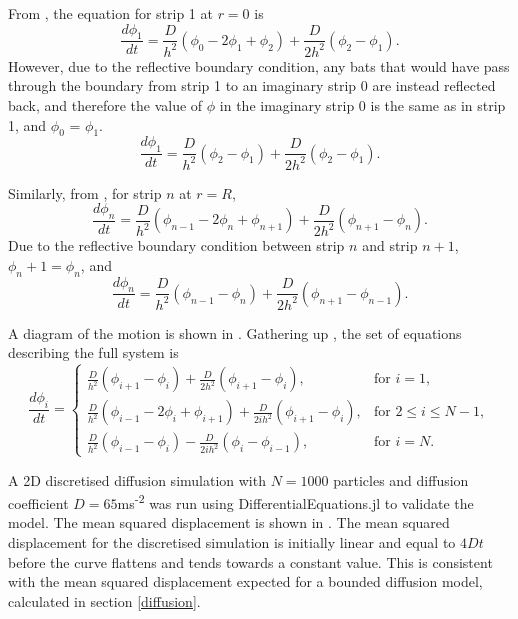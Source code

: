 From , the equation for strip 1 at $r=0$ is
%
\begin{equation}
\frac{d\phi_1}{dt} = \frac{D}{h^2}(\phi_{0}-2\phi_1 +\phi_{2}) + \frac{D}{2h^2} (\phi_{2}-\phi_{1}).
\end{equation}
%
However, due to the reflective boundary condition, any bats that would have pass through the boundary from strip 1 to an imaginary strip 0 are instead reflected back, and therefore the value of $\phi$ in the imaginary strip 0 is the same as in strip 1, and $\phi_0$ = $\phi_1$.
%
\begin{equation}
\frac{d\phi_1}{dt} = \frac{D}{h^2}(\phi_{2}- \phi_1) + \frac{D}{2h^2} (\phi_{2}-\phi_{1}) .
        \label{eqn:strip_1}
\end{equation}

Similarly, from , for strip $n$ at $r=R$,
%
\begin{equation}
\frac{d\phi_n}{dt} = \frac{D}{h^2}(\phi_{n-1}-2\phi_n +\phi_{n+1}) + \frac{D}{2h^2} (\phi_{n+1}-\phi_{n}) .
\end{equation}
%
Due to the reflective boundary condition between strip $n$ and strip $n+1$, $\phi_n+1 = \phi_n$, and
\begin{equation}
\frac{d\phi_n}{dt} = \frac{D}{h^2}(\phi_{n-1}-\phi_n) + \frac{D}{2h^2} (\phi_{n+1}-\phi_{n-1}) .
        \label{eqn:strip_n}
\end{equation}

 A diagram of the motion is shown in . Gathering up , the set of equations describing the full system is
%
  \begin{equation}
  \frac{d\phi_i}{dt} = \begin{cases}
  		\frac{D}{h^2}(\phi_{i+1} - \phi_{i}) + \frac{D}{2h^2} (\phi_{i+1}-\phi_i), & \text{for } i = 1, \\
  		\frac{D}{h^2}(\phi_{i-1}-2\phi_i +\phi_{i+1}) + \frac{D}{2ih^2} (\phi_{i+1}-\phi_{i}), & \text{for } 2 \leq i \leq N-1, \\
  		\frac{D}{h^2}(\phi_{i-1}-\phi_i) - \frac{D}{2ih^2} (\phi_{i}-\phi_{i-1}), & \text{for } i = N .
  		\end{cases}
          \label{eqn:discrete_diffusion2d}
  \end{equation}


 A 2D discretised diffusion simulation with $N=1000$ particles and diffusion coefficient $D=65$ms\textsuperscript{-2} was run using DifferentialEquations.jl \cite{DifferentialEquations} to validate the model. The mean squared displacement is shown in . The mean squared displacement for the discretised simulation is initially linear and equal to $4Dt$ before the curve flattens and tends towards a constant value. This is consistent with the mean squared displacement expected for a bounded diffusion model, calculated in section \ref{diffusion}.

